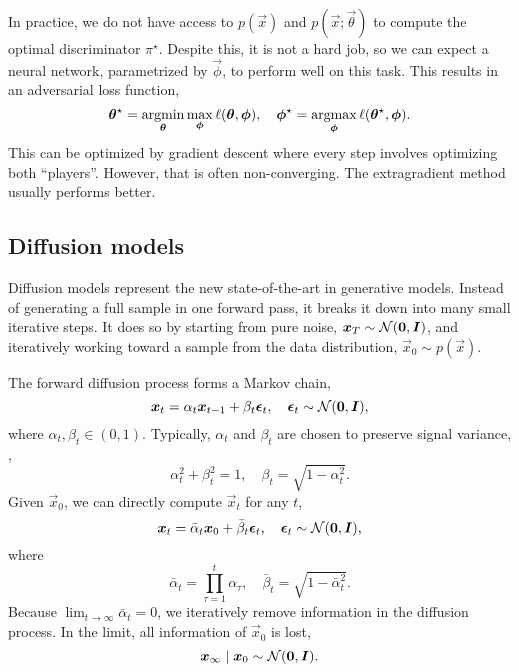 In practice, we do not have access to $p(\vec{x})$ and $p(\vec{x}; \vec{\theta})$ to compute the
optimal discriminator $\pi^\star$. Despite this, it is not a hard job, so we can expect a neural
network, parametrized by $\vec{\phi}$, to perform well on this task. This results in an adversarial
loss function, \[
    \bm{\theta}^\star = \operatorname*{argmin}_{\bm{\theta}} \max_{\bm{\phi}} \ell(\bm{\theta}, \bm{\phi}), \quad \bm{\phi}^\star = \operatorname*{argmax}_{\bm{\phi}} \ell(\bm{\theta}^\star, \bm{\phi}).
\]
This can be optimized by gradient descent where every step involves optimizing both ``players''.
However, that is often non-converging. The extragradient method usually performs better.

\subsection{Diffusion models}

Diffusion models represent the new state-of-the-art in generative models. Instead of generating a
full sample in one forward pass, it breaks it down into many small iterative steps. It does so by
starting from pure noise, $\bm{x}_T \sim \mathcal{N}(\bm{0}, \bm{I})$, and iteratively working
toward a sample from the data distribution, $\vec{x}_0 \sim p(\vec{x})$.

The forward diffusion process forms a Markov chain, \[
    \bm{x}_t = \alpha_t \bm{x}_{t-1} + \beta_t \bm{\epsilon}_t, \quad \bm{\epsilon}_t \sim \mathcal{N}(\bm{0}, \bm{I}),
\]
where $\alpha_t, \beta_t \in (0,1)$. Typically, $\alpha_t$ and $\beta_t$ are chosen to preserve
signal variance, \ie, \[
    \alpha_t^2 + \beta_t^2 = 1, \quad \beta_t = \sqrt{1 - \alpha_t^2}.
\]
Given $\vec{x}_0$, we can directly compute $\vec{x}_t$ for any $t$, \[
    \bm{x}_t = \bar{\alpha}_t \bm{x}_0 + \bar{\beta}_t \bm{\epsilon}_t, \quad \bm{\epsilon}_t \sim \mathcal{N}(\bm{0}, \bm{I}),
\]
where \[
    \bar{\alpha}_t = \prod_{\tau=1}^{t} \alpha_\tau, \quad \bar{\beta}_t = \sqrt{1 - \bar{\alpha}_t^2}.
\]
Because $\lim_{t \to \infty} \bar{\alpha}_t = 0$, we iteratively remove information in the
diffusion process. In the limit, all information of $\vec{x}_0$ is lost, \[
    \bm{x}_{\infty} \mid \bm{x}_0 \sim \mathcal{N}(\bm{0}, \bm{I}).
\]

